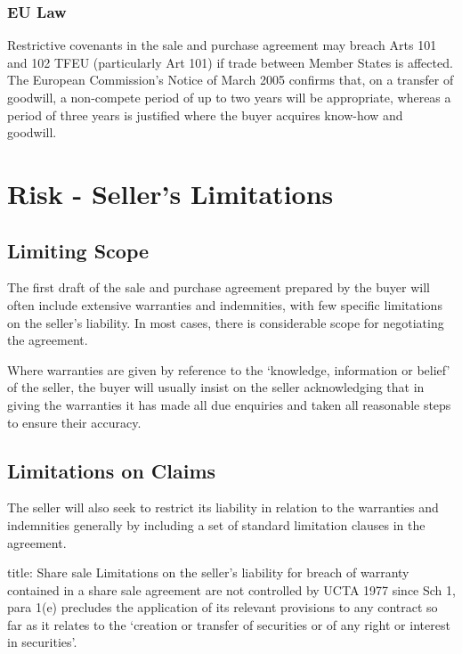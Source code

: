 \documentclass[
]{article}
\newenvironment{Shaded}{}{}
\newcommand{\NormalTok}[1]{#1}
\begin{document}
\hypertarget{eu-law}{%
\subsubsection{EU Law}\label{eu-law}}

Restrictive covenants in the sale and purchase agreement may breach Arts
101 and 102 TFEU (particularly Art 101) if trade between Member States
is affected. The European Commission's Notice of March 2005 confirms
that, on a transfer of goodwill, a non-compete period of up to two years
will be appropriate, whereas a period of three years is justified where
the buyer acquires know-how and goodwill.

\hypertarget{risk---sellers-limitations}{%
\section{Risk - Seller's Limitations}\label{risk---sellers-limitations}}

\hypertarget{limiting-scope}{%
\subsection{Limiting Scope}\label{limiting-scope}}

The first draft of the sale and purchase agreement prepared by the buyer
will often include extensive warranties and indemnities, with few
specific limitations on the seller's liability. In most cases, there is
considerable scope for negotiating the agreement.

Where warranties are given by reference to the `knowledge, information
or belief' of the seller, the buyer will usually insist on the seller
acknowledging that in giving the warranties it has made all due
enquiries and taken all reasonable steps to ensure their accuracy.

\hypertarget{limitations-on-claims}{%
\subsection{Limitations on Claims}\label{limitations-on-claims}}

The seller will also seek to restrict its liability in relation to the
warranties and indemnities generally by including a set of standard
limitation clauses in the agreement.

\begin{Shaded}
\begin{Highlighting}[]
\NormalTok{title: Share sale}
\NormalTok{Limitations on the seller’s liability for breach of warranty contained in a share sale agreement are not controlled by UCTA 1977 since Sch 1, para 1(e) precludes the application of its relevant provisions to any contract so far as it relates to the ‘creation or transfer of securities or of any right or interest in securities’.}
\end{Highlighting}
\end{Shaded}
\end{document}
